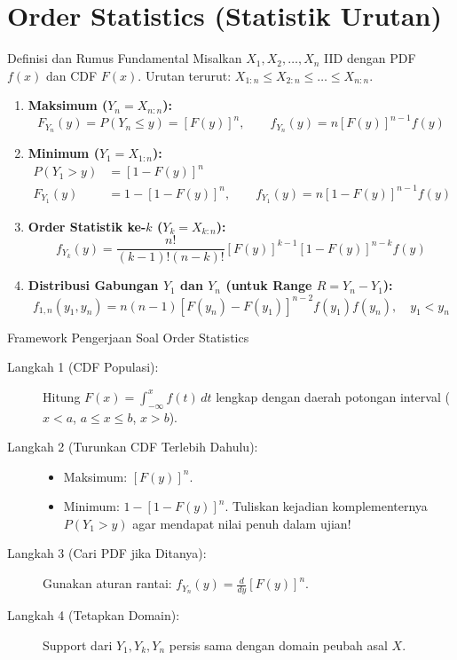 \documentclass[10pt,twoside]{article}
\begin{document}
\section{Order Statistics (Statistik Urutan)}

\begin{teoribox}{Definisi dan Rumus Fundamental}
Misalkan $X_1, X_2, \dots, X_n$ IID dengan PDF $f(x)$ dan CDF $F(x)$.
Urutan terurut: $X_{1:n} \le X_{2:n} \le \dots \le X_{n:n}$.
\begin{enumerate}
  \item \textbf{Maksimum ($Y_n = X_{n:n}$):}
    \begin{equation*}
      F_{Y_n}(y) = P(Y_n \le y) = [F(y)]^n, \qquad f_{Y_n}(y) = n [F(y)]^{n-1} f(y)
    \end{equation*}
  \item \textbf{Minimum ($Y_1 = X_{1:n}$):}
    \begin{align*}
      P(Y_1 > y) &= [1 - F(y)]^n \\
      F_{Y_1}(y) &= 1 - [1 - F(y)]^n, \qquad f_{Y_1}(y) = n [1 - F(y)]^{n-1} f(y)
    \end{align*}
  \item \textbf{Order Statistik ke-$k$ ($Y_k = X_{k:n}$):}
    \begin{equation*}
      f_{Y_k}(y) = \frac{n!}{(k-1)!(n-k)!} [F(y)]^{k-1} [1 - F(y)]^{n-k} f(y)
    \end{equation*}
  \item \textbf{Distribusi Gabungan $Y_1$ dan $Y_n$ (untuk Range $R = Y_n - Y_1$):}
    \begin{equation*}
      f_{1,n}(y_1, y_n) = n(n-1) [F(y_n) - F(y_1)]^{n-2} f(y_1) f(y_n), \quad y_1 < y_n
    \end{equation*}
\end{enumerate}
\end{teoribox}

\begin{stepbox}{Framework Pengerjaan Soal Order Statistics}
\begin{description}
  \item[Langkah 1 (CDF Populasi):] Hitung $F(x) = \int_{-\infty}^x f(t)\,dt$ lengkap dengan daerah potongan interval ($x < a$, $a \le x \le b$, $x > b$).
  \item[Langkah 2 (Turunkan CDF Terlebih Dahulu):]
    \begin{itemize}
      \item Maksimum: $[F(y)]^n$.
      \item Minimum: $1 - [1 - F(y)]^n$. Tuliskan kejadian komplementernya $P(Y_1 > y)$ agar mendapat nilai penuh dalam ujian!
    \end{itemize}
  \item[Langkah 3 (Cari PDF jika Ditanya):] Gunakan aturan rantai: $f_{Y_n}(y) = \frac{d}{dy}[F(y)]^n$.
  \item[Langkah 4 (Tetapkan Domain):] Support dari $Y_1, Y_k, Y_n$ persis sama dengan domain peubah asal $X$.
\end{description}
\end{stepbox}
\end{document}
